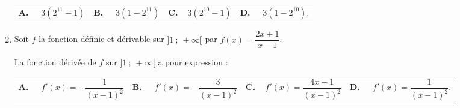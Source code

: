 \begin{enumerate}
\medskip

\begin{tabularx}{\linewidth}{*{4}{X}}
\textbf{A.~~} $3\left(2^{11}-1\right) $ &\textbf{B.~~} $3\left(1-2^{11}\right) $&\textbf{C.~~}$3\left(2^{10}-1\right) $& \textbf{D.~~} $ 3\left(1-2^{10}\right) $.
\end{tabularx}


\item Soit $f$ la fonction définie et dérivable sur $]1~;~+\infty[$ par $f(x)=\dfrac{2x+1}{x-1}$.

La fonction dérivée de $f$ sur $]1~;~+\infty[$ a pour expression :

\medskip

\begin{tabularx}{\linewidth}{*{4}{X}}
\textbf{A.~~} {\small $f'(x)=-\dfrac{1}{(x-1)^2}$} &\textbf{B.~~} {\small $f'(x)=-\dfrac{3}{(x-1)^2} $}&\textbf{C.~~}{\small $f'(x)=\dfrac{4x-1}{(x-1)^2}$}& \textbf{D.~~} {\small $f'(x)=\dfrac{1}{(x-1)^2}$}.
\end{tabularx}
\end{enumerate}

\vspace{0,5cm}
